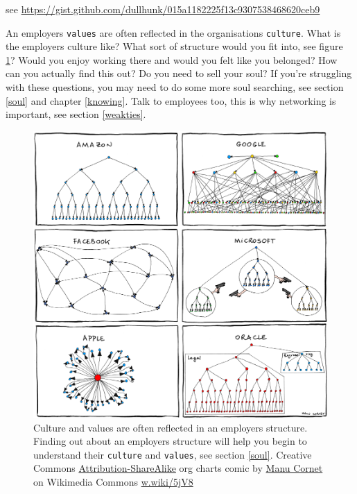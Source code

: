 \documentclass[
]{book}
\begin{document}
see \url{https://gist.github.com/dullhunk/015a1182225f13c9307538468620ceb9}

An employers \texttt{values} are often reflected in the organisations \texttt{culture}. What is the employers culture like? What sort of structure would you fit into, see figure \ref{fig:pyramid-fig}? Would you enjoy working there and would you felt like you belonged? How can you actually find this out? Do you need to sell your soul? If you're struggling with these questions, you may need to do some more soul searching, see section \ref{soul} and chapter \ref{knowing}. Talk to employees too, this is why networking is important, see section \ref{weakties}.

\begin{figure}

{\centering \includegraphics[width=0.99\linewidth]{images/Manu_Cornet_pyramid} 

}

\caption{Culture and values are often reflected in an employers structure. Finding out about an employers structure will help you begin to understand their \texttt{culture} and \texttt{values}, see section \ref{soul}. Creative Commons \href{https://creativecommons.org/licenses/by-sa/3.0/deed.en}{Attribution-ShareAlike} org charts comic by \href{https://en.wikipedia.org/wiki/Manu_Cornet}{Manu Cornet} on Wikimedia Commons \href{https://w.wiki/5jV8}{w.wiki/5jV8}}\label{fig:pyramid-fig}
\end{figure}
\end{document}
